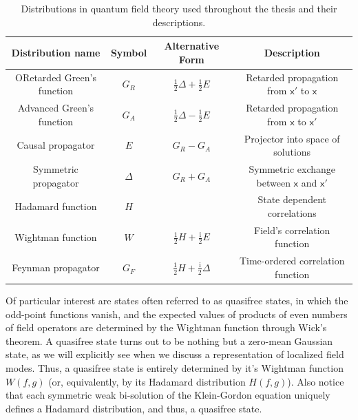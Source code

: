 \documentclass[letterpaper,12pt,titlepage,oneside,final]{book}
\newcommand{\mf}{\mathsf}%
\newcommand{\ii}{\mathrm{i}}
\begin{document}
{\color{red}
\begin{table}[h!]

\footnotesize

\centering
\color{black}

\begin{tabular}{ |c|c|c|c| } 

\hline

Distribution name & Symbol &  Alternative Form & Description  \\
\hline
\hline
{\normalsize {\color{white}O}}Retarded Green's function & $G_R$ & $\tfrac{1}{2}\Delta+\tfrac{1}{2}E$ & Retarded propagation from $\mf x'$ to $\mf x$  \\
\hline
Advanced Green's function & $G_A$ & $\tfrac{1}{2}\Delta-\tfrac{1}{2}E$ & Retarded propagation from $\mf x$ to $\mf x'$  \\
\hline
Causal propagator & $E$ &  $G_R - G_A$ & Projector into space of solutions  \\ 
\hline
Symmetric propagator & $\Delta$ &  $G_R + G_A$ & Symmetric exchange between $\mf x$ and $\mf x'$  \\ 

\hline
Hadamard function & $H$ &   & State dependent correlations\\


\hline
Wightman function & $W$ &  $\tfrac{1}{2}H + \tfrac{\ii}{2}E$ & Field's correlation function  \\
\hline
Feynman propagator & $G_F$  & $\tfrac{1}{2}H + \tfrac{\ii}{2}\Delta$ & Time-ordered correlation function \\ 
\hline
 
\end{tabular}

\caption{Distributions in quantum field theory used throughout the thesis and their descriptions.\label{tab}}
\end{table}



}


Of particular interest are states often referred to as quasifree states, in which the odd-point functions vanish, and the expected values of products of even numbers of field operators are determined by the Wightman function through Wick's theorem. A quasifree state turns out to be nothing but a zero-mean Gaussian state, as we will explicitly see when we discuss a representation of localized field modes. Thus, a quasifree state is entirely determined by it's Wightman function $W(f,g)$ (or, equivalently, by its Hadamard distribution $H(f,g)$). Also notice that each symmetric weak bi-solution of the Klein-Gordon equation uniquely defines a Hadamard distribution, and thus, a quasifree state.
\end{document}
